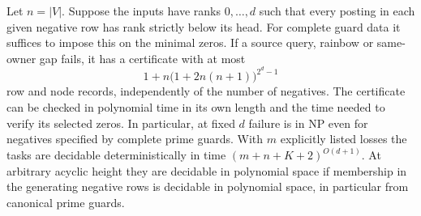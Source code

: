 \begin{theorem}
\label{core:thm:bounded-height-guard-certificate}
Let $n=|V|$. Suppose the inputs have ranks $0,\ldots,d$ such that
every posting in each given negative row has rank strictly below
its head. For complete guard data it suffices to impose this on
the minimal zeros.
If a source query, rainbow or same-owner gap fails, it has a
certificate with at most
\[
  1+n\bigl(1+2n(n+1)\bigr)^{2^d-1}
\]
row and node records, independently of the number of negatives.
The certificate can be checked in polynomial time in its own length
and the time needed to verify its selected zeros. In particular, at
fixed $d$ failure is in NP even for negatives specified by complete
prime guards. With $m$ explicitly listed losses the tasks are
decidable deterministically in time $(m+n+K+2)^{O(d+1)}$.
At arbitrary acyclic height they are decidable in polynomial space
if membership in the generating negative rows is decidable in
polynomial space, in particular from canonical prime guards.
\end{theorem}
